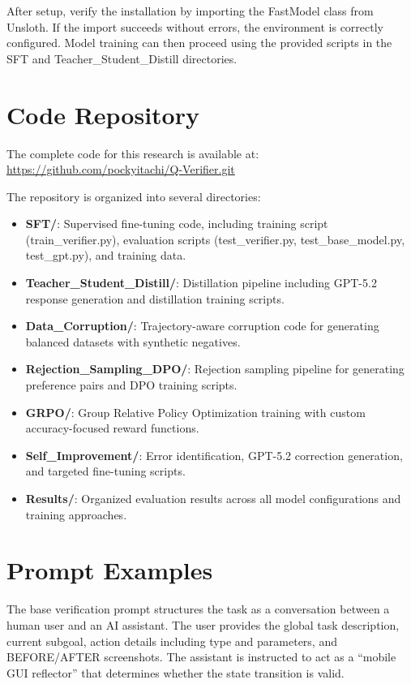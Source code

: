 \documentclass[11pt,a4paper]{article}
\begin{document}
After setup, verify the installation by importing the FastModel class from Unsloth. If the import succeeds without errors, the environment is correctly configured. Model training can then proceed using the provided scripts in the SFT and Teacher\_Student\_Distill directories.

\section{Code Repository}

The complete code for this research is available at: \url{https://github.com/pockyitachi/Q-Verifier.git}

The repository is organized into several directories:
\begin{itemize}
    \item \textbf{SFT/}: Supervised fine-tuning code, including training script (train\_verifier.py), evaluation scripts (test\_verifier.py, test\_base\_model.py, test\_gpt.py), and training data.
    \item \textbf{Teacher\_Student\_Distill/}: Distillation pipeline including GPT-5.2 response generation and distillation training scripts.
    \item \textbf{Data\_Corruption/}: Trajectory-aware corruption code for generating balanced datasets with synthetic negatives.
    \item \textbf{Rejection\_Sampling\_DPO/}: Rejection sampling pipeline for generating preference pairs and DPO training scripts.
    \item \textbf{GRPO/}: Group Relative Policy Optimization training with custom accuracy-focused reward functions.
    \item \textbf{Self\_Improvement/}: Error identification, GPT-5.2 correction generation, and targeted fine-tuning scripts.
    \item \textbf{Results/}: Organized evaluation results across all model configurations and training approaches.
\end{itemize}

\section{Prompt Examples}

The base verification prompt structures the task as a conversation between a human user and an AI assistant. The user provides the global task description, current subgoal, action details including type and parameters, and BEFORE/AFTER screenshots. The assistant is instructed to act as a ``mobile GUI reflector'' that determines whether the state transition is valid.
\end{document}
